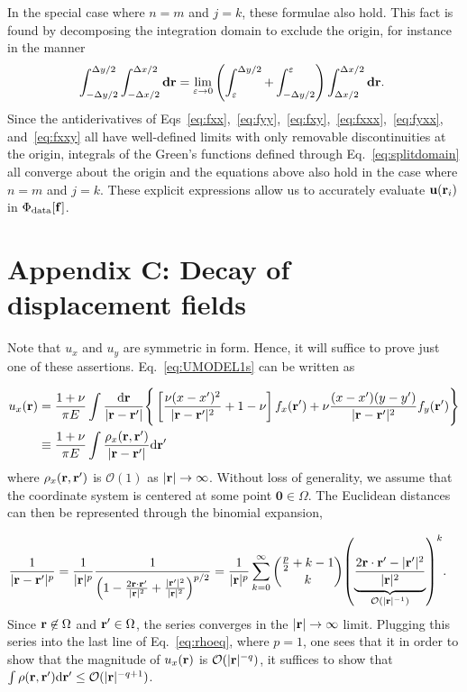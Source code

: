 \documentclass[aps,prl,reprint,twocolumn,groupedaddress,showpacs]{revtex4}
\def\d{{\bf d}}
\def\dd{\mbox{d}}
\def\f{{\bf f}}
\def\r{{\bf r}}
\def\u{{\bf u}}
\begin{document}
\begin{widetext}
In the special case where $n=m$ and $j=k$, these formulae also
hold. This fact is found by decomposing the integration domain to
exclude the origin, for instance in the manner
\begin{equation}
\int_{ -\Delta y/2 }^{\Delta y/2 }\int_{- \Delta x/2 }^{\Delta x/2 } \d\r = 
\lim_{\varepsilon\to0} \left( \int_\varepsilon^{\Delta y/2}  
+  \int_{-\Delta y/2}^\varepsilon   \right)\int_{\Delta x/2}^{\Delta x/2} \d\r.~\label{eq:splitdomain}
\end{equation}
Since the antiderivatives of
Eqs~\ref{eq:fxx},~\ref{eq:fyy},~\ref{eq:fxy},~\ref{eq:fxxx},~\ref{eq:fyxx},
and~\ref{eq:fxxy} all have well-defined limits with only removable
discontinuities at the origin, integrals of the Green's functions
defined through Eq.~\ref{eq:splitdomain} all converge about the origin
and the equations above also hold in the case where $n=m$ and $j=k$.
These explicit expressions allow us to accurately evaluate
$\u(\r_{i})$ in $\Phi_{\rm data}[\f]$.

\section{Appendix C: Decay of displacement fields}

Note that $u_x$ and $u_y$ are symmetric in form. Hence, it will
suffice to prove just one of these assertions. Eq.~\ref{eq:UMODEL1s}
can be written as

\begin{align}
u_x(\r) & = \frac{1+\nu}{\pi E} \int \frac{\dd \r}{|\r-\r'|} 
\Bigg\{ \left[ \frac{\nu(x - x')^2}{|\r-\r'|^2} + 1-\nu \right]f_{x}(\r') +
\nu\frac{(x-x')(y-y')}{|\r-\r'|^2} f_y(\r')  \Bigg\} \nonumber\\
& \equiv \frac{1+\nu}{\pi E}   \int\frac{\rho_x(\r,\r')}{|\r-\r'|} \dd \r'  \label{eq:rhoeq}
\end{align}
where $\rho_x(\r,\r')$ is $\mathcal{O}(1)$ as
$\vert\r\vert\to\infty$. Without loss of generality, we assume that
the coordinate system is centered at some point
$\mathbf{0}\in\Omega$. The Euclidean distances can then be represented
through the binomial expansion,

\begin{align}
\frac{1}{|\r-\r'|^p} &= \frac{1}{|\r|^p}\frac{1}{\left(1 - \frac{2\r\cdot\r'}{|\r|^2} 
+\frac{\vert\r'\vert^{2}}{\vert\r\vert^{2}}\right)^{p/2}} = \frac{1}{|\r|^p}\sum_{k=0}^\infty {{{p\over 2}+k-1}\choose{k}} 
{\left( \underbrace{ \frac{2\r\cdot\r' - |\r'|^2}{|\r|^2}}_{\mathcal{O}(|\r|^{-1})} \right)}^k.
\end{align}
% 
Since $\r\not\in\Omega$ and $\r'\in\Omega$, the series converges in
the $\vert \r\vert \to \infty$ limit. Plugging this series into the
last line of Eq.~\ref{eq:rhoeq}, where $p=1$, one sees that it in order to show
that the magnitude of $u_x(\r)$ is $\mathcal{O}(|\r|^{-q})$, it
suffices to show that $\int \rho(\r,\r')\dd\r' \leq
{\cal O}(|\r|^{-q+1})$.


\end{widetext}
\end{document}
